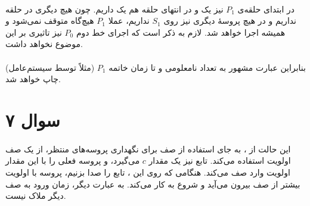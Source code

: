 \documentclass{article}
\begin{document}
	\paragraph*{}
	در ابتدای حلقه‌ی
	$P_1$
	نیز یک
	و در انتهای حلقه هم یک
	داریم. چون هیچ
	دیگری در حلقه نداریم و در هیچ پروسهٔ دیگری نیز روی
	$S_1$
	نداریم، عملا
	$P_1$
	هیچ‌گاه متوقف نمی‌شود و همیشه اجرا خواهد شد.
	لازم به ذکر است که اجرای خط دوم
	$P_0$
	نیز تاثیری بر این موضوع نخواهد داشت.

	\paragraph*{}
	بنابراین عبارت مشهور
	به تعداد نامعلومی و تا زمان خاتمه
	$P_1$
	(مثلاً توسط سیستم‌عامل)
	 چاپ خواهد شد.

	 \section*{سوال ۷}
	 \paragraph*{}

	 این حالت از
	 ،
	 به جای استفاده از صف
	 برای نگهداری پروسه‌های منتظر، از یک صف اولویت استفاده می‌کند. تابع
	 نیز یک مقدار
	 $c$
	 می‌گیرد، و پروسه فعلی را با این مقدار اولویت وارد صف می‌کند. هنگامی که روی این
	 ،
	 تابع
	 را صدا بزنیم، پروسه با اولویت بیشتر از صف بیرون می‌آید و شروع به کار می‌کند. به عبارت دیگر، زمان ورود به صف دیگر ملاک نیست.
\end{document}
